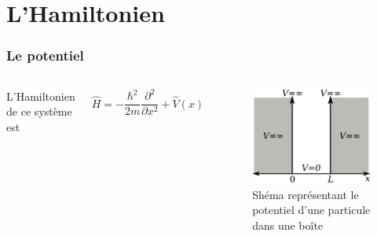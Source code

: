 \documentclass{beamer}
\begin{document}
\section{L'Hamiltonien}
\begin{frame}
\frametitle{Le potentiel}

\begin{columns}
L'Hamiltonien de ce système est

\begin{equation}\tag{2}
\hat{H}=-\frac{\hbar^2}{2m}\frac{\partial^2}{\partial x^2}+\hat{V}(x)
\end{equation} 

\begin{figure}
\includegraphics[scale=0.4]{Pot}
\caption{Shéma représentant le potentiel d'une particule dans une boîte}
\end{figure}
\end{columns}

\end{frame}
\end{document}
